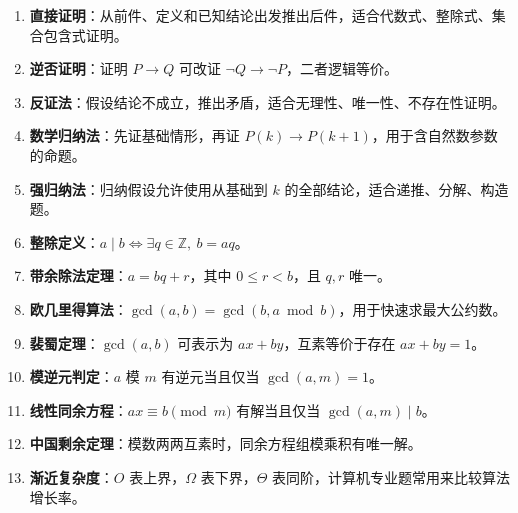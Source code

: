 \begin{enumerate}
	\item \textbf{直接证明}：从前件、定义和已知结论出发推出后件，适合代数式、整除式、集合包含式证明。
	\item \textbf{逆否证明}：证明 \(P\to Q\) 可改证 \(\neg Q\to\neg P\)，二者逻辑等价。
	\item \textbf{反证法}：假设结论不成立，推出矛盾，适合无理性、唯一性、不存在性证明。
	\item \textbf{数学归纳法}：先证基础情形，再证 \(P(k)\to P(k+1)\)，用于含自然数参数的命题。
	\item \textbf{强归纳法}：归纳假设允许使用从基础到 \(k\) 的全部结论，适合递推、分解、构造题。
	\item \textbf{整除定义}：\(a\mid b\Leftrightarrow \exists q\in\mathbb Z,\ b=aq\)。
	\item \textbf{带余除法定理}：\(a=bq+r\)，其中 \(0\le r<b\)，且 \(q,r\) 唯一。
	\item \textbf{欧几里得算法}：\(\gcd(a,b)=\gcd(b,a\bmod b)\)，用于快速求最大公约数。
	\item \textbf{裴蜀定理}：\(\gcd(a,b)\) 可表示为 \(ax+by\)，互素等价于存在 \(ax+by=1\)。
	\item \textbf{模逆元判定}：\(a\) 模 \(m\) 有逆元当且仅当 \(\gcd(a,m)=1\)。
	\item \textbf{线性同余方程}：\(ax\equiv b\pmod m\) 有解当且仅当 \(\gcd(a,m)\mid b\)。
	\item \textbf{中国剩余定理}：模数两两互素时，同余方程组模乘积有唯一解。
	\item \textbf{渐近复杂度}：\(O\) 表上界，\(\Omega\) 表下界，\(\Theta\) 表同阶，计算机专业题常用来比较算法增长率。
\end{enumerate}
